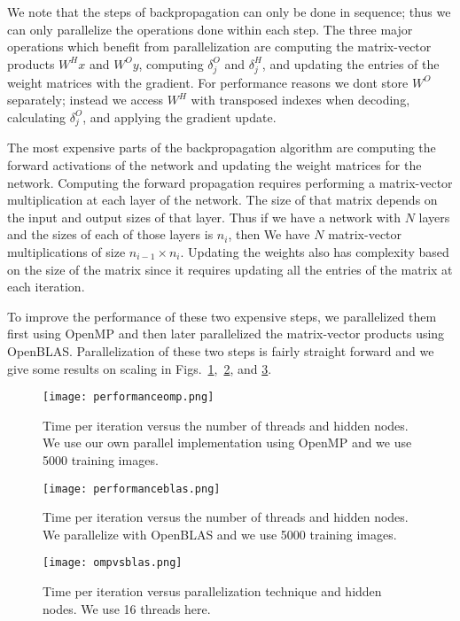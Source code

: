 We note that the steps of backpropagation can only be done in sequence; thus we can only parallelize the operations done within each step. The three major operations which benefit from parallelization are computing the matrix-vector products $W^{H}x$ and $W^{O}y$, computing $\delta^O_j$ and $\delta^H_j$, and updating the entries of the weight matrices with the gradient. For performance reasons we dont store $W^O$ separately; instead we access $W^H$ with transposed indexes when decoding, calculating $\delta^O_j$, and applying the gradient update.

The most expensive parts of the backpropagation algorithm are computing the forward activations of the network and updating the weight matrices for the network. Computing the forward propagation requires performing a matrix-vector multiplication at each layer of the network. The size of that matrix depends on the input and output sizes of that layer. Thus if we have a network with $N$ layers and the sizes of each of those layers is $n_i$, then We have $N$ matrix-vector multiplications of size $n_{i-1} \times n_i$. Updating the weights also has complexity based on the size of the matrix since it requires updating all the entries of the matrix at each iteration.

To improve the performance of these two expensive steps, we parallelized them first using OpenMP and then later parallelized the matrix-vector products using OpenBLAS. Parallelization of these two steps is fairly straight forward and we give some results on scaling in Figs.~\ref{fig:performanceomp},~\ref{fig:performanceblas}, and \ref{fig:ompvsblas}.


\begin{figure}[h]
\centering
\texttt{[image: performanceomp.png]}
\caption{Time per iteration versus the number of threads and hidden nodes. We use our own parallel implementation using OpenMP and we use 5000 training images.}
\label{fig:performanceomp}
\end{figure}


\begin{figure}[h]
\centering
\texttt{[image: performanceblas.png]}
\caption{Time per iteration versus the number of threads and hidden nodes. We parallelize with OpenBLAS and we use 5000 training images.}
\label{fig:performanceblas}
\end{figure}

\begin{figure}[h]
\centering
\texttt{[image: ompvsblas.png]}
\caption{Time per iteration versus parallelization technique and hidden nodes. We use 16 threads here.}
\label{fig:ompvsblas}
\end{figure}

